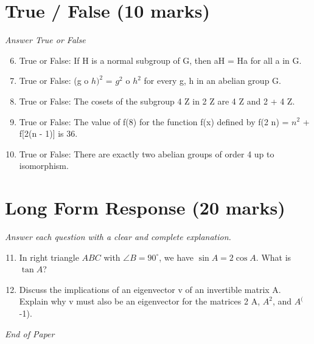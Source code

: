 \documentclass[12pt]{article}
\begin{document}
\section*{True / False (10 marks)}
\textit{Answer True or False}
\begin{enumerate}[label=\arabic*.]
\setcounter{enumi}{5}
\item True or False: If H is a normal subgroup of G, then aH = Ha for all a in G.
\item True or False: (g o $h)^2$ = $g^2$ o $h^2$ for every g, h in an abelian group G.
\item True or False: The cosets of the subgroup 4 Z in 2 Z are 4 Z and 2 + 4 Z.
\item True or False: The value of f(8) for the function f(x) defined by f(2 n) = $n^2$ + f[2(n - 1)] is 36.
\item True or False: There are exactly two abelian groups of order 4 up to isomorphism.
\end{enumerate}

\section*{Long Form Response (20 marks)}
\textit{Answer each question with a clear and complete explanation.}
\begin{enumerate}[label=\arabic*.]
\setcounter{enumi}{10}
\item In right triangle $ABC$ with $\angle B = 90^\circ$, we have $\sin A = 2\cos A$. What is $\tan A$?
\item Discuss the implications of an eigenvector v of an invertible matrix A. Explain why v must also be an eigenvector for the matrices 2 A, $A^2$, and $A^($-1).
\end{enumerate}

\vfill
\noindent\textit{End of Paper}
\end{document}
